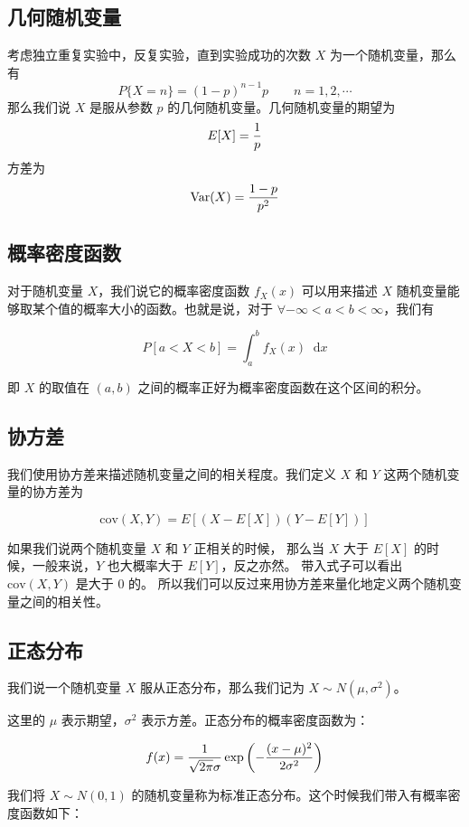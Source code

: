 \documentclass[utf8,a4paper,nofonts,9pt]{ctexbook}
\def\dif{\mathop{}\!\mathrm{d}}
\begin{document}
\subsection{几何随机变量}

考虑独立重复实验中，反复实验，直到实验成功的次数 $X$ 为一个随机变量，那么有
\[
    P\{ X = n\} = (1 - p)^{n - 1} p \qquad n = 1, 2, \cdots
\]
那么我们说 $X$ 是服从参数 $p$ 的几何随机变量。几何随机变量的期望为
\[
    E[X] = {1 \over p}
\]
方差为
\[
    \textrm{Var}(X) = {1 - p \over p^2}
\]

\subsection{概率密度函数}

对于随机变量 $X$，我们说它的概率密度函数 $f_X(x)$ 可以用来描述 $X$ 随机变量能够取某个值的概率大小的函数。也就是说，对于 $\forall -\infty < a < b < \infty$，我们有

$$
P\left[ a < X < b \right] = \int_{a}^{b} f_X(x) \dif{x}
$$

即 $X$ 的取值在 $(a, b)$ 之间的概率正好为概率密度函数在这个区间的积分。

\subsection{协方差}

我们使用协方差来描述随机变量之间的相关程度。我们定义 $X$ 和 $Y$ 这两个随机变量的协方差为

$$
\textrm{cov}(X, Y) = E\left[ ( X - E[X] ) ( Y - E[Y] ) \right]
$$

如果我们说两个随机变量 $X$ 和 $Y$ 正相关的时候，
那么当 $X$ 大于 $E[X]$ 的时候，一般来说，$Y$ 也大概率大于 $E[Y]$，反之亦然。
带入式子可以看出 $\textrm{cov}(X, Y)$ 是大于 $0$ 的。
所以我们可以反过来用协方差来量化地定义两个随机变量之间的相关性。

\subsection{正态分布}

我们说一个随机变量 $X$ 服从正态分布，那么我们记为 $X \sim N(\mu, \sigma^2)$。

这里的 $\mu$ 表示期望，$\sigma^2$ 表示方差。正态分布的概率密度函数为：

$$
f(x) = {1 \over \sqrt{2\pi}\sigma} \exp\left(-{(x - \mu)^2 \over 2\sigma^2}\right)
$$

我们将 $X \sim N(0, 1)$ 的随机变量称为标准正态分布。这个时候我们带入有概率密度函数如下：
\end{document}
